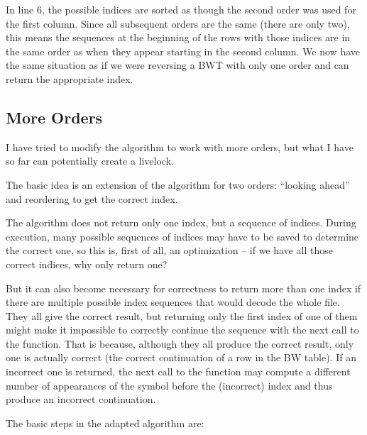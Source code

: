 \documentclass[a4paper]{scrreprt}
\begin{document}
In line 6, the possible indices are sorted as though the second order was used
for the first column. Since all subsequent orders are the same (there are only
two), this means the sequences at the beginning of the rows with those indices
are in the same order as when they appear starting in the second column. We now
have the same situation as if we were reversing a BWT with only one order and
can return the appropriate index.

\subsection{More Orders}

I have tried to modify the algorithm to work with more orders, but what I have
so far can potentially create a livelock.

The basic idea is an extension of the algorithm for two orders: ``looking
ahead'' and reordering to get the correct index.

The algorithm does not return only one index, but a sequence of indices.
During execution, many possible sequences of indices may have to be saved to
determine the correct one, so this is, first of all, an optimization -- if we
have all those correct indices, why only return one?

But it can also become
necessary for correctness to return more than one index if there are multiple
possible index sequences that would decode the whole file. They all give the
correct result, but returning only the first index of one of them might make it
impossible to correctly continue the sequence with the next call to the
function. That is because, although they all produce the correct result, only
one is actually correct (the correct continuation of a row in the BW table). If
an incorrect one is returned, the next call to the function may compute a
different number of appearances of the symbol before the (incorrect) index and
thus produce an incorrect continuation.

The basic steps in the adapted algorithm are:
\end{document}

